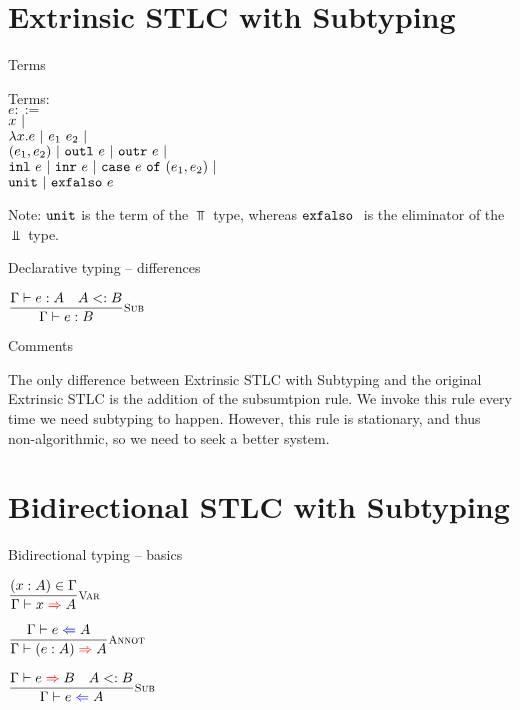 \documentclass{beamer}
\begin{document}
\section{Extrinsic STLC with Subtyping}

\begin{frame}{Terms}

Terms: \\
$e ::=$ \\
\qquad $x \pipe$ \\
\qquad $\fun{x}{e} \pipe \app{e_1}{e_2} \pipe$ \\
\qquad $\pair{e_1}{e_2} \pipe \outl{e} \pipe \outr{e} \pipe$ \\
\qquad $\inl{e} \pipe \inr{e} \pipe \case{e}{e_1}{e_2} \pipe$ \\
\qquad $\unit \pipe \exfalso{e}$

\vspace{2em}

Note: $\unit$ is the term of the $\Top$ type, whereas $\exfalso$ is the eliminator of the $\Bot$ type.

\end{frame}

\begin{frame}{Declarative typing -- differences}

\begin{center}
  $\infrule[Sub]{\typing{e}{A} \quad \sidecond{\subtyping{A}{B}}}{\typing{e}{B}}$
\end{center}

\end{frame}

\begin{frame}{Comments}

The only difference between Extrinsic STLC with Subtyping and the original Extrinsic STLC is the addition of the subsumtpion rule. We invoke this rule every time we need subtyping to happen. However, this rule is stationary, and thus non-algorithmic, so we need to seek a better system.

\end{frame}

\section{Bidirectional STLC with Subtyping}

\begin{frame}{Bidirectional typing -- basics}

\begin{center}
  $\infrule[Var]{\sidecond{(x : A) \in \Gamma}}{\infer{x}{A}}$

  \vspace{2em}

  $\infrule[Annot]{\check{e}{A}}{\infer{\annot{e}{A}}{A}}$

  \vspace{2em}

  $\infrule[Sub]{\infer{e}{B} \quad \sidecond{\subtyping{A}{B}}}{\check{e}{A}}$
\end{center}

\end{frame}
\end{document}
